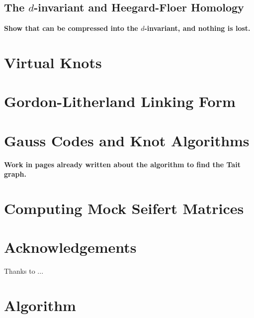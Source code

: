 \documentclass[12pt]{report}
\newcommand{\notered}[1]{{\color{Red} \textbf{#1}}}
\newcommand{\notegreen}[1]{{\color{Green} \textbf{#1}}}
\begin{document}
\section{\notegreen{The $d$-invariant and Heegard-Floer Homology}}
\notegreen{Show that can be compressed into the $d$-invariant, and nothing is lost.}

\chapter{Virtual Knots}

\chapter{Gordon-Litherland Linking Form}

\chapter{Gauss Codes and Knot Algorithms}
\notered{Work in pages already written about the algorithm to find the Tait graph.}


\chapter{Computing Mock Seifert Matrices}


\chapter*{Acknowledgements}

Thanks to ...

\newpage
\printbibliography[title=References]


\appendix
{}
\titlespacing*{\chapter}{0pt}{40pt}{30pt}

\chapter{Algorithm}
\end{document}
